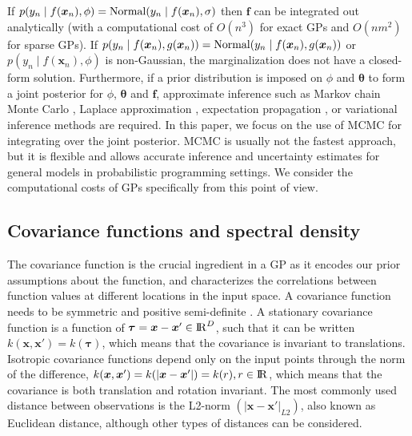 If $p(y_n \mid f(\bm{x}_n),\phi)=\operatorname{Normal}(y_n \mid f(\bm{x}_n),\sigma)$ then $\bm{f}$ can be integrated out analytically (with a computational cost of $O(n^3)$ for exact GPs and $O(nm^2)$ for sparse GPs). If $p(y_n \mid f(\bm{x}_n),g(\bm{x}_n))=\operatorname{Normal}(y_n \mid f(\bm{x}_n),g(\bm{x}_n))$ or $p(y_n \mid f(\bm{x}_n),\phi)$ is non-Gaussian, the marginalization does not have a closed-form solution. Furthermore, if a prior distribution is imposed on $\phi$ and $\bm{\theta}$ to form a joint posterior for $\phi$, $\bm{\theta}$ and $\bm{f}$, approximate inference such as Markov chain Monte Carlo \citep[MCMC; ][]{brooks_2011}, Laplace approximation \citep{williams1998bayesian,rasmussen2006gaussian}, expectation propagation \citep{minka2001expectation}, or variational inference methods \citep{gibbs2000variational,csato2000efficient} are required. In this paper, we focus on the use of MCMC for integrating over the joint posterior. MCMC is usually not the fastest approach, but it is flexible and allows accurate inference and uncertainty estimates for general models in probabilistic programming settings. We consider the computational costs of GPs specifically from this point of view.

\subsection{Covariance functions and spectral density}\label{ch4_sec_cov}

The covariance function is the crucial ingredient in a GP as it encodes our prior assumptions about the function, and characterizes the correlations between function values at different locations in the input space. A covariance function needs to be symmetric and positive semi-definite \citep{rasmussen2006gaussian}. A stationary covariance function is a function of $\bm{\tau}=\bm{x}-\bm{x}' \in {\rm I\!R}^D$, such that it can be written $k(\bm{x},\bm{x}') = k(\bm{\tau})$, which means that the covariance is invariant to translations. Isotropic covariance functions depend only on the input points through the norm of the difference, $k(\bm{x},\bm{x}') = k(|\bm{x}-\bm{x}'|) = k(r), r\in {\rm I\!R}$, which means that the covariance is both translation and rotation invariant. The most commonly used distance between observations is the L2-norm $(|\bm{x}-\bm{x}'|_{L2})$, also known as Euclidean distance, although other types of distances can be considered. 


